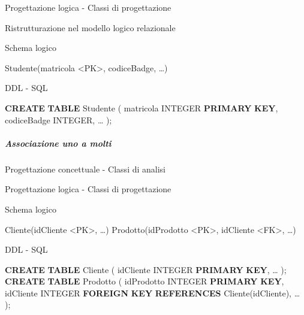 \documentclass[italian,a4paper]{article}
\newenvironment{Shaded}{}{}
\newcommand{\DataTypeTok}[1]{\textcolor[rgb]{0.56,0.13,0.00}{#1}}
\newcommand{\KeywordTok}[1]{\textcolor[rgb]{0.00,0.44,0.13}{\textbf{#1}}}
\newcommand{\NormalTok}[1]{#1}
\begin{document}
Progettazione logica - Classi di progettazione



Ristrutturazione nel modello logico relazionale



Schema logico

\begin{Shaded}
\begin{Highlighting}[]
\NormalTok{Studente(matricola \textless{}PK\textgreater{}, codiceBadge, …)}
\end{Highlighting}
\end{Shaded}

DDL - SQL

\begin{Shaded}
\begin{Highlighting}[]
\KeywordTok{CREATE} \KeywordTok{TABLE}\NormalTok{ Studente (}
\NormalTok{    matricola }\DataTypeTok{INTEGER} \KeywordTok{PRIMARY} \KeywordTok{KEY}\NormalTok{,}
\NormalTok{    codiceBadge }\DataTypeTok{INTEGER}\NormalTok{,}
\NormalTok{    …}
\NormalTok{);}
\end{Highlighting}
\end{Shaded}

\subparagraph{Associazione uno a molti}\label{associazione-uno-a-molti}

Progettazione concettuale - Classi di analisi



Progettazione logica - Classi di progettazione



Schema logico

\begin{Shaded}
\begin{Highlighting}[]
\NormalTok{Cliente(idCliente \textless{}PK\textgreater{}, …)}
\NormalTok{Prodotto(idProdotto \textless{}PK\textgreater{}, idCliente \textless{}FK\textgreater{}, …)}
\end{Highlighting}
\end{Shaded}

DDL - SQL

\begin{Shaded}
\begin{Highlighting}[]
\KeywordTok{CREATE} \KeywordTok{TABLE}\NormalTok{ Cliente (}
\NormalTok{    idCliente }\DataTypeTok{INTEGER} \KeywordTok{PRIMARY} \KeywordTok{KEY}\NormalTok{,}
\NormalTok{    …}
\NormalTok{);}
\KeywordTok{CREATE} \KeywordTok{TABLE}\NormalTok{ Prodotto (}
\NormalTok{    idProdotto }\DataTypeTok{INTEGER} \KeywordTok{PRIMARY} \KeywordTok{KEY}\NormalTok{,}
\NormalTok{    idCliente }\DataTypeTok{INTEGER} \KeywordTok{FOREIGN} \KeywordTok{KEY} \KeywordTok{REFERENCES}\NormalTok{ Cliente(idCliente),}
\NormalTok{    …}
\NormalTok{);}
\end{Highlighting}
\end{Shaded}
\end{document}
